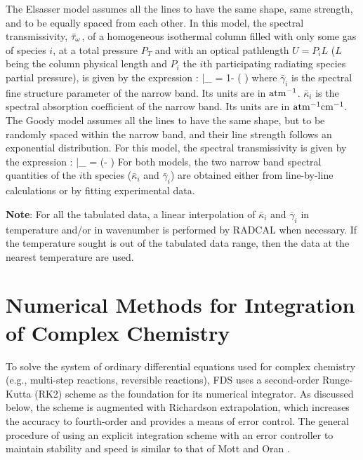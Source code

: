 The Elsasser model assumes all the lines to have the same shape, same strength,
and to be equally spaced from each other. In this model, the spectral
transmissivity, $\bar{\tau}_{\omega}$, of a homogeneous isothermal column filled
with only some gas of species $i$,
at a total pressure $P_T$ and with an optical pathlength $U = P_i L$ ($L$
being the column physical length and $P_i$ the $i$th participating radiating
species partial pressure), is given by the expression \cite{Modest:2003}:
\be\label{eq::Elsasser}
    \bar{\tau}_{\om} = 1- \erf \left(   \right)
\ee
where $\bar{\gamma}_i$ is the spectral fine structure parameter of the narrow
band. Its units are in $\rm atm^{-1}$. $\bar{\kappa}_i$ is the spectral absorption coefficient of the narrow
band. Its units are in $\rm atm^{-1}cm^{-1}$. The Goody model assumes all the lines to have the same shape, but to be randomly
spaced within the narrow band, and their line strength follows an exponential
distribution. For this model, the spectral transmissivity is given by the expression \cite{Modest:2003}:
\be\label{eq::Goody}
    \bar{\tau}_{\om} = \exp\left(- {\displaystyle {}}\right)
\ee
For both models, the two narrow band spectral quantities of the $i$th species ($\bar{\kappa}_i$ and
$\bar{\gamma}_i$) are obtained either from line-by-line calculations or by fitting
experimental data.

\textbf{Note}: For all the tabulated data, a linear interpolation of
$\bar{\kappa}_i$ and $\bar{\gamma}_i$ in temperature and/or in wavenumber is
performed by RADCAL when necessary. If the temperature sought is out of the
tabulated data range, then the data at the nearest temperature are used.





\chapter{Numerical Methods for Integration of Complex Chemistry}
\label{chemistry_integration}

To solve the system of ordinary differential equations used for complex chemistry (e.g., multi-step reactions, reversible reactions), FDS uses a second-order Runge-Kutta (RK2) scheme as the foundation for its numerical integrator.  As discussed below, the scheme is augmented with Richardson extrapolation, which increases the accuracy to fourth-order and provides a means of error control. The general procedure of using an explicit integration scheme with an error controller to maintain stability and speed is similar to that of Mott and Oran \cite{Mott:2001}.

